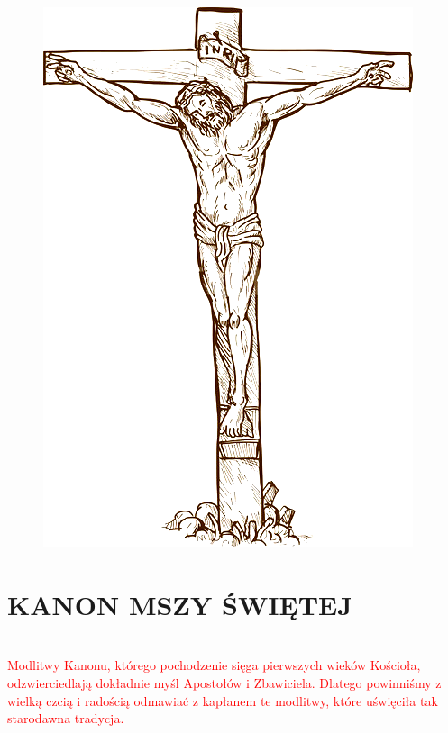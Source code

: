 \documentclass[12pt,titlepage]{book}
\newcommand{\rub}[1]{\textcolor{red}{\\#1}}
\newcommand*\cleartoleftpage{%
	\clearpage
	\ifodd\value{page}\hbox{}\newpage\fi
}
\begin{document}
	\cleartoleftpage
	\begin{figure}[h]
		\includegraphics{cross.png}
	\end{figure}
	\cleardoublepage
	\section{KANON MSZY ŚWIĘTEJ}
	\rub{Modlitwy Kanonu, którego pochodzenie sięga pierwszych wieków Kościoła, odzwierciedlają dokładnie myśl Apostołów i Zbawiciela. Dlatego powinniśmy z wielką czcią i radością odmawiać z kapłanem te modlitwy, które uświęciła tak starodawna tradycja.}
	
\end{document}
